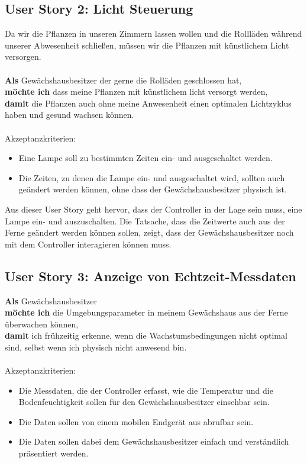 \subsection{User Story 2: Licht Steuerung}
Da wir die Pflanzen in unseren Zimmern lassen wollen und die Rollläden während unserer Abwesenheit schließen, müssen wir die Pflanzen mit künstlichem Licht versorgen. 
\\ \\
\textbf{Als} Gewächshausbesitzer der gerne die Rolläden geschlossen hat,\\
\textbf{möchte ich} dass meine Pflanzen mit künstlichem licht versorgt werden, \\
\textbf{damit} die Pflanzen auch ohne meine Anwesenheit einen optimalen Lichtzyklus haben und gesund wachsen können.
\\ \\
Akzeptanzkriterien: 
\begin{itemize}
    \item Eine Lampe soll zu bestimmten Zeiten ein- und ausgeschaltet werden.
    \item Die Zeiten, zu denen die Lampe ein- und ausgeschaltet wird, sollten auch geändert werden können, ohne dass der Gewächshausbesitzer physisch ist.
\end{itemize}
Aus dieser User Story geht hervor, dass der Controller in der Lage sein muss, eine Lampe ein- und auszuschalten. 
Die Tatsache, dass die Zeitwerte auch aus der Ferne geändert werden können sollen, zeigt, dass der Gewächshausbesitzer noch mit dem Controller interagieren können muss.

\subsection{User Story 3: Anzeige von Echtzeit-Messdaten}
\textbf{Als} Gewächshausbesitzer\\
\textbf{möchte ich} die Umgebungsparameter in meinem Gewächshaus aus der Ferne überwachen können,\\
\textbf{damit} ich frühzeitig erkenne, wenn die Wachstumsbedingungen nicht optimal sind, selbst wenn ich physisch nicht anwesend bin.
\\ \\
Akzeptanzkriterien: 
\begin{itemize}
    \item Die Messdaten, die der Controller erfasst, wie die Temperatur und die Bodenfeuchtigkeit sollen für den Gewächshausbesitzer einsehbar sein.
    \item Die Daten sollen von einem mobilen Endgerät aus abrufbar sein. 
    \item Die Daten sollen dabei dem Gewächshausbesitzer einfach und verständlich präsentiert werden.
\end{itemize}


